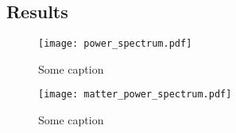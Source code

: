 \subsection{Results}\label{sec:m4:results}


  

    \begin{figure}
        \texttt{[image: power\_spectrum.pdf]}
        \caption{Some caption}
        \label{fig:m3:some}
    \end{figure}

    \begin{figure}
        \texttt{[image: matter\_power\_spectrum.pdf]}
        \caption{Some caption}
        \label{fig:m3:some}
    \end{figure}